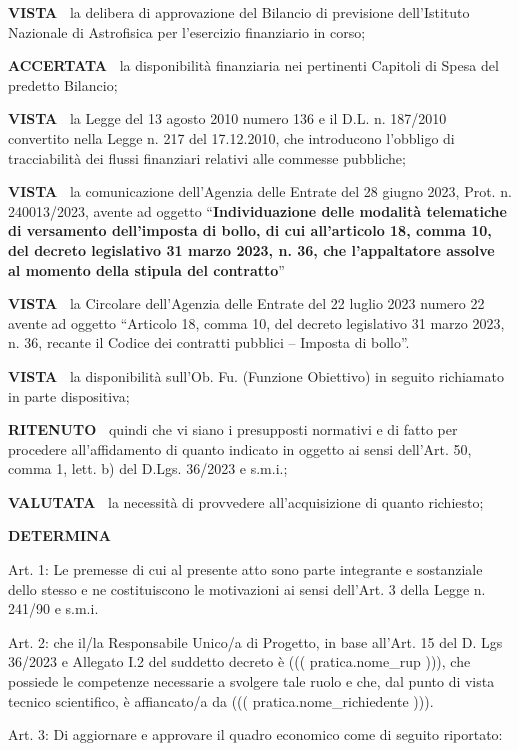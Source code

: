 \documentclass[a4paper,12pt]{letter}
\begin{document}
\textbf{VISTA~}	la delibera di approvazione del Bilancio di previsione
dell’Istituto Nazionale di Astrofisica per l’esercizio finanziario
 in corso;

\textbf{ACCERTATA~}	la disponibilità finanziaria nei pertinenti
Capitoli di Spesa del predetto Bilancio;

\textbf{VISTA~}	la Legge del 13 agosto 2010 numero 136	e il
D.L. n. 187/2010 convertito nella Legge n. 217 del 17.12.2010, che
introducono l’obbligo di tracciabilità dei flussi finanziari relativi
alle commesse pubbliche;

\textbf{VISTA~}	la comunicazione dell’Agenzia delle Entrate del 28
giugno 2023,  Prot. n. 240013/2023,  avente ad oggetto	``\textbf{Individuazione
delle modalità telematiche di versamento dell’imposta di bollo, di cui
all’articolo 18, comma 10, del decreto legislativo 31 marzo 2023, n. 36,
che l’appaltatore assolve al momento della stipula del contratto}''

\textbf{VISTA~}	la Circolare dell’Agenzia delle Entrate del 22 luglio
2023 numero 22 avente ad oggetto ``Articolo 18, comma 10, del decreto
legislativo 31 marzo 2023, n. 36, recante il Codice dei contratti pubblici
– Imposta di bollo''.

\textbf{VISTA~}	la disponibilità sull’Ob. Fu. (Funzione Obiettivo)
in seguito richiamato in parte dispositiva;

\textbf{RITENUTO~}	 quindi che vi siano i presupposti normativi e
di fatto per procedere all’affidamento di quanto indicato in oggetto
ai sensi dell’Art. 50, comma 1, lett. b) del D.Lgs. 36/2023 e s.m.i.;

\textbf{VALUTATA~}	la necessità di provvedere all’acquisizione
di quanto richiesto;

\begin{center}
	\textbf{DETERMINA}
\end{center}

Art. 1: Le premesse di cui al presente atto sono parte integrante e
sostanziale dello stesso e ne costituiscono le motivazioni ai sensi
dell’Art. 3 della Legge n. 241/90 e s.m.i.

Art. 2: che il/la Responsabile Unico/a di Progetto, in base all’Art. 15 del
D. Lgs 36/2023 e Allegato I.2 del suddetto decreto è ((( pratica.nome_rup ))),
che possiede le competenze necessarie a svolgere tale ruolo
e che, dal punto di vista tecnico scientifico, è affiancato/a da
((( pratica.nome_richiedente ))).

Art. 3: Di aggiornare e approvare il quadro economico come di seguito riportato:
\end{document}
